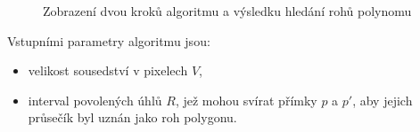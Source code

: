 \begin{figure}[H]
  \begin{center}
    \caption{Zobrazení dvou kroků algoritmu a výsledku hledání rohů polynomu}
    \label{prilohaHledaniRohuObr}
  \end{center}
\end{figure}

\noindent Vstupními parametry algoritmu jsou:
\begin{itemize}
  \item velikost sousedství v pixelech $V$,
  \item interval povolených úhlů $R$, jež mohou svírat přímky $p$ a $p'$, aby
  jejich průsečík byl uznán jako roh polygonu. 
\end{itemize}

